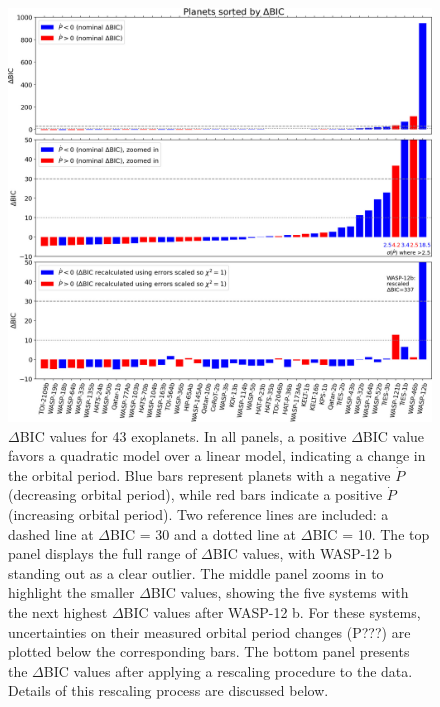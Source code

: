 \documentclass[oneside,12pt]{amsart}
\numberwithin{page}{section}
\begin{document}

\begin{figure}[htbp]
    \centering
    \includegraphics[width=0.9\linewidth]{figs/adams_fig2.jpg}
    \caption{$\Delta$BIC values for 43 exoplanets. In all panels, a positive $\Delta$BIC value favors a quadratic model over a linear model, indicating a change in the orbital period. Blue bars represent planets with a negative $\dot{P}$ (decreasing orbital period), while red bars indicate a positive $\dot{P}$ (increasing orbital period). Two reference lines are included: a dashed line at $\Delta$BIC = 30 and a dotted line at $\Delta$BIC = 10. 
    The top panel displays the full range of $\Delta$BIC values, with WASP-12 b standing out as a clear outlier. The middle panel zooms in to highlight the smaller $\Delta$BIC values, showing the five systems with the next highest $\Delta$BIC values after WASP-12 b. For these systems, uncertainties on their measured orbital period changes (P???) are plotted below the corresponding bars. The bottom panel presents the $\Delta$BIC values after applying a rescaling procedure to the data. Details of this rescaling process are discussed below.}
    \label{fig:adams-fig2}
\end{figure}
\end{document}
